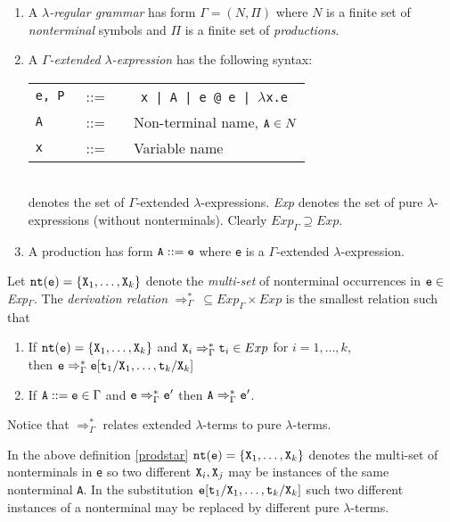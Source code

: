 \documentclass{LMCS}
\newcommand{\fl}{\noindent}
\newcommand{\vair}{\relax}
\newcommand{\be}{\begin{enumerate}}
\newcommand{\ee}{\end{enumerate}}
\newcommand{\bt}{\begin{tabular}}
\newcommand{\et}{\end{tabular}}
\newcommand{\bdfn}{\begin{defi}}
\newcommand{\edfn}{\end{defi}}
\theoremstyle{definition}\newtheorem{env}[thm]{Environment}
\begin{document}
\bdfn \label{def-lamda-reg}\hfill

\be[(1)]
\item A {\em $\lambda$-regular grammar} has form $\Gamma =(N,\Pi)$ where $N$ is a
finite set of {\em nonterminal} symbols and $\Pi$ is a finite set of {\em productions}.
\bigskip

\item A {\em $\Gamma$-extended  $\lambda$-expression} has the following syntax:\medskip

\bt{lcl}
{\tt e, P} &\ ::=\ &\  {\tt
x | A | e @ e | $\lambda$x.e}\\
{\tt A} &\ ::=\ &\  {\rm Non-terminal name, ${\tt
A}\in N$}\\
{\tt x} &\ ::=\ &\  {\rm Variable name}\\
\et\\

 \fl{\em Exp$_\Gamma$} denotes the set of $\Gamma$-extended $\lambda$-expressions. {\em Exp} denotes the set of pure $\lambda$-expressions (without nonterminals). Clearly $Exp_\Gamma\supseteq Exp$.
\bigskip


\item A production has form ${\tt A} ::= {\tt e}$ where {\tt e}
is a  $\Gamma$-extended  $\lambda$-expression. \ee
\edfn

\fl


\bdfn \label{prodstar}Let  ${\tt nt(e)}=\{{\tt X}_1,\ldots,{\tt X}_k\}$ denote the {\em multi-set} of nonterminal
occurrences in  ${\tt e}\in$ {\em Exp$_\Gamma$}. 
The {\em derivation  relation }
$ \Rightarrow^*_\Gamma\   \subseteq Exp_\Gamma\times Exp$ is  the
smallest relation such that

\be[(1)]
\item  If  ${\tt nt(e)}=\{{\tt X}_1,\ldots,{\tt X}_k\}$ and 
${\tt X}_i \Rightarrow^*_\Gamma {\tt t}_i \in Exp$ for $i=1,\ldots,k$, \\then
${\tt e} \Rightarrow^*_\Gamma  {\tt e}[{\tt t}_1/{\tt X}_1,\ldots,{\tt t}_k/{\tt X}_k]$\vair

\item If ${\tt A} ::= {\tt e} \in \Gamma$ and ${\tt e} \Rightarrow^*_\Gamma  {\tt e'}$ then ${\tt A} \Rightarrow^*_\Gamma {\tt e'}$.
\vair
\ee
\edfn

Notice that $\Rightarrow^*_\Gamma$ relates extended $\lambda$-terms to pure $\lambda$-terms.
\vair

In the above definition \ref{prodstar} ${\tt nt(e)}=\{{\tt X}_1,\ldots,{\tt X}_k\}$ denotes the multi-set of nonterminals in {\tt e} so two different ${\tt X}_i,{\tt X}_j$ may be instances of the same nonterminal {\tt A}. In the substitution ${\tt e}[{\tt t}_1/{\tt X}_1,\ldots,{\tt t}_k/{\tt X}_k]$ such two different instances of a nonterminal may be replaced by different pure $\lambda$-terms. 
\end{document}
